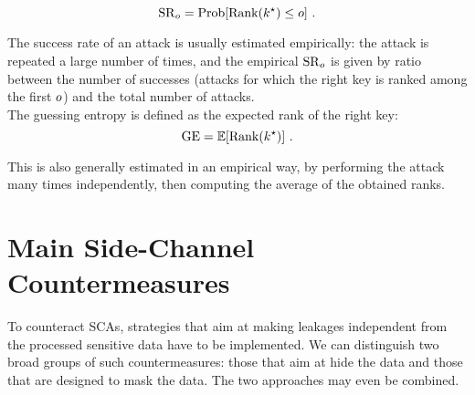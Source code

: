 \begin{equation}
\mathrm{SR}_o = \mathrm{Prob}[\mathrm{Rank}(k^\star)\leq o] \mbox{ .}
\end{equation}

The success rate of an attack is usually estimated empirically: the attack is repeated a large number of times, and the empirical $\mathrm{SR}_o$ is given by ratio between the number of successes (attacks for which the right key is ranked among the first $o$) and the total number of attacks. \\

The guessing entropy \cite{massey1994guessing} is defined as the expected rank of the right key: 
\begin{equation}
\mathrm{GE} = \mathbb{E}[\mathrm{Rank}(k^\star)]\mbox{ .}
\end{equation}

This is also generally estimated in an empirical way, by performing the attack many times independently, then computing the average of the obtained ranks. 

\section{Main Side-Channel Countermeasures}\label{sec:countermeasures}
To counteract SCAs, strategies that aim at making leakages independent from the processed sensitive data have to be implemented. We can distinguish two broad groups of such countermeasures: 
those that aim at hide the data and those that are designed to mask the data. The two approaches may even be combined.

